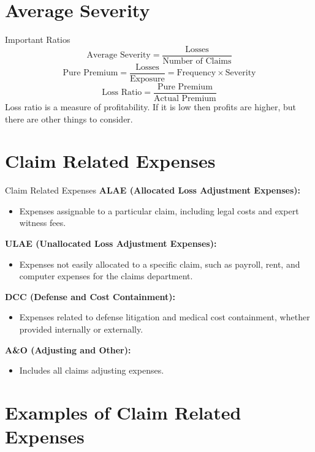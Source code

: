 \documentclass[compress,mathserif]{beamer}
\begin{document}
\section{Average Severity}

\begin{frame}{Important Ratios}
 \[ \text{Average Severity} = \frac{\text{Losses}}{\text{Number of Claims}} \]
  \[ \text{Pure Premium} =  \frac{\text{Losses}}{\text{Exposure}} = \text{Frequency}\times \text{Severity} \]
 \[ \text{Loss Ratio} = \frac{\text{Pure Premium}}{\text{Actual Premium}} \]
Loss ratio is a measure of profitability. If it is low then profits are higher, but there are other things to consider. 
\end{frame}

\section{Claim Related Expenses}

\begin{frame}{Claim Related Expenses}
    \textbf{ALAE (Allocated Loss Adjustment Expenses):}
    \begin{itemize}
        \item Expenses assignable to a particular claim, including legal costs and expert witness fees.
    \end{itemize}

    \textbf{ULAE (Unallocated Loss Adjustment Expenses):}
    \begin{itemize}
        \item Expenses not easily allocated to a specific claim, such as payroll, rent, and computer expenses for the claims department.
    \end{itemize}

    \textbf{DCC (Defense and Cost Containment):}
    \begin{itemize}
        \item Expenses related to defense litigation and medical cost containment, whether provided internally or externally.
    \end{itemize}

    \textbf{A\&O (Adjusting and Other):}
    \begin{itemize}
        \item Includes all claims adjusting expenses.
    \end{itemize}
\end{frame}

\section{Examples of Claim Related Expenses}
\end{document}
